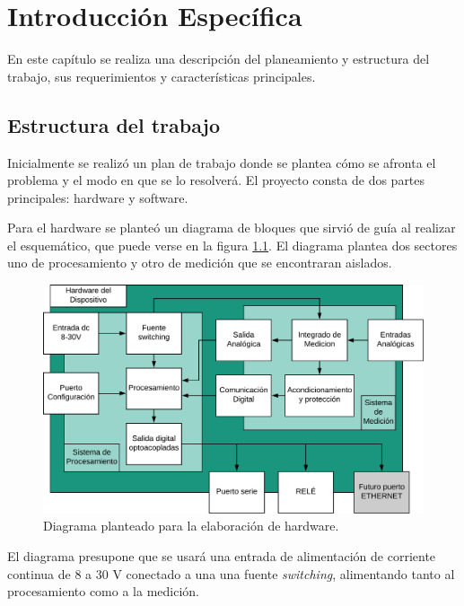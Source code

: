 \chapter{Introducción Específica} %

\label{Chapter2}

En este capítulo se realiza una descripción del planeamiento y estructura del trabajo, sus requerimientos y características principales.

\section{Estructura del trabajo}
\label{sec:cap2parte1}
Inicialmente se realizó un plan de trabajo donde se plantea cómo se afronta el problema y el modo en que se lo resolverá. El proyecto consta de dos partes principales: hardware y software.

Para el hardware se planteó un diagrama de bloques que sirvió de guía al realizar el esquemático, que puede verse en la figura \ref{fig:bloquess1}. El diagrama plantea dos sectores uno de procesamiento y otro de medición que se encontraran aislados.

\begin{figure}[h]
	\centering
	\includegraphics[width=120mm,keepaspectratio]{Figures/concepto.jpeg}
	\caption{Diagrama planteado para la elaboración de hardware.}
	\label{fig:bloquess1}
\end{figure}

El diagrama presupone que se usará una entrada de alimentación de corriente continua de 8 a 30 V conectado a una una fuente \textit{switching}, alimentando tanto al procesamiento como a la medición.

